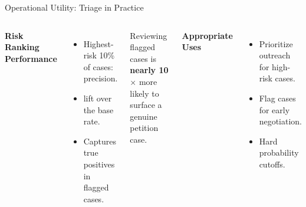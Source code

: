 \documentclass[10pt, aspectratio=169]{beamer}
\begin{document}
\begin{frame}{Operational Utility: Triage in Practice}
 \begin{columns}
 \textbf{Risk Ranking Performance}
 \begin{itemize}
 \item Highest-risk 10\% of cases: \textbf{\metricTopDecilePrecision{}} precision.
 \item \textbf{\metricTopDecileLift{}} lift over the base rate.
 \item Captures \metricTopDecileTP{} true positives in \metricTopDecileN{} flagged cases.
 \end{itemize}
 \vspace{0.8em}
 Reviewing flagged cases is \textbf{nearly 10$\times$} more likely to surface a genuine petition case.

 \textbf{Appropriate Uses}
 \begin{itemize}
 \item[\checkmark] Prioritize outreach for high-risk cases.
 \item[\checkmark] Flag cases for early negotiation.
 \item[$\times$] Hard probability cutoffs.
 \end{itemize}
 \end{columns}
\end{frame}
\end{document}
